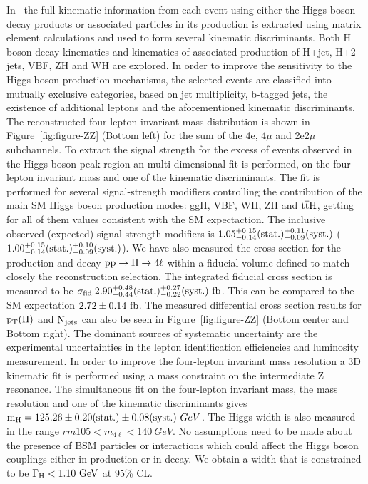 \documentclass[10pt]{article}
\begin{document}
In~\cite{CMS:2017jkd} the full kinematic information from each event using either
the Higgs boson decay products or associated particles in its production is
extracted using matrix element calculations and used to form several kinematic
discriminants. Both H boson decay kinematics and kinematics of associated
production of H+jet, H+2 jets, VBF, ZH and WH are explored. In order to improve
the sensitivity to the Higgs boson production mechanisms, the selected events
are classified into mutually exclusive categories, based on jet multiplicity,
b-tagged jets, the existence of additional leptons and the aforementioned
kinematic discriminants. The reconstructed four-lepton invariant mass distribution
is shown in Figure~\ref{fig:figure-ZZ} (Bottom left) for the sum of the 4e,
4$\mu$ and 2e2$\mu$ subchannels. To extract the signal strength for the excess
of events observed in the Higgs boson peak region an multi-dimensional fit
is performed, on the four-lepton invariant mass and one of the kinematic
discriminants. The fit is performed for several signal-strength modifiers
controlling the contribution of the main SM Higgs boson production modes: ggH,
VBF, WH, ZH and ${\rm t{\bar t}H}$, getting for all of them values consistent
with the SM expectaction. The inclusive observed (expected) signal-strength
modifiers is ${\rm 1.05_{-0.14}^{+0.15}(stat.)_{-0.09}^{+0.11}(syst.)}$
(${\rm 1.00_{-0.14}^{+0.15}(stat.)_{-0.09}^{+0.10}(syst.)}$). We have also
measured the cross section for the production and decay ${\rm pp \to H \to 4\ell}$
within a fiducial volume defined to match closely the reconstruction selection.
The integrated fiducial cross section is measured to be
${\rm \sigma_{fid.} 2.90_{-0.44}^{+0.48}(stat.)_{-0.22}^{+0.27}(syst.)~fb}$.
This can be compared to the SM expectation
${\rm 2.72 \pm 0.14~fb}$. The measured differential cross section results for
${\rm p_{T}(H)}$ and ${\rm N_{jets}}$ can also be seen in Figure~\ref{fig:figure-ZZ}
(Bottom center and Bottom right). The dominant sources of systematic uncertainty are
the experimental uncertainties in the lepton identification efficiencies and
luminosity measurement. In order to improve the four-lepton invariant mass
resolution a 3D kinematic fit is performed using a mass constraint on the
intermediate Z resonance. The simultaneous fit on the four-lepton
invariant mass, the mass resolution and one of the kinematic discriminants
gives ${\rm m_{H} = 125.26 \pm 0.20(stat.) \pm 0.08(syst.)}~GeV$. The Higgs
width is also measured in the range ${rm 105 < m_{4\ell} < 140~GeV}$. No
assumptions need to be made about the presence of BSM particles or interactions
which could affect the Higgs boson couplings either in production or in decay.
We obtain a width that is constrained to be ${\rm \Gamma_{H} < 1.10~GeV}$ at
95\% CL.
\end{document}
